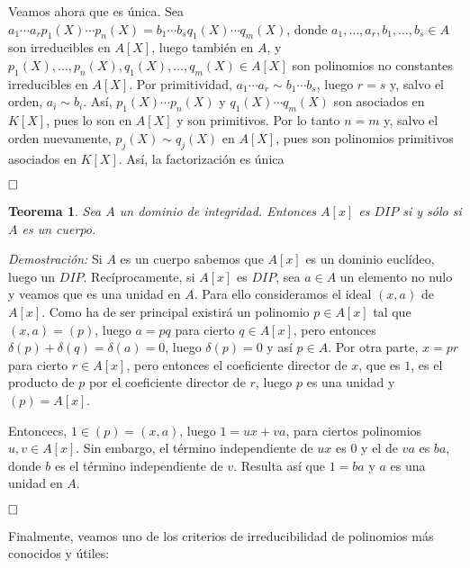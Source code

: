 \documentclass[12pt]{article}
\newtheorem{theorem}{Teorema}[section]
\begin{document}
Veamos ahora que es única. Sea $a_1\cdots a_rp_1(X) \cdots p_n(X)= b_1\cdots b_sq_1(X) \cdots q_m(X)$, donde $a_1, \ldots, a_r, b_1, \ldots, b_s \in A$ son irreducibles en $A[X]$, luego también en $A$, y $p_1(X), \ldots, p_n(X), q_1(X), \ldots, q_m(X) \in A[X]$ son polinomios no constantes irreducibles en $A[X]$. Por primitividad, $a_1 \cdots a_r \sim b_1 \cdots b_s$, luego $r=s$ y, salvo el orden, $a_i \sim b_i$. Así, $p_1(X) \cdots p_n(X)$ y $q_1(X) \cdots q_m(X)$ son asociados en $K[X]$, pues lo son en $A[X]$ y son primitivos. Por lo tanto $n=m$ y, salvo el orden nuevamente, $p_j(X) \sim q_j(X)$ en $A[X]$, pues son polinomios primitivos asociados en $K[X]$. Así, la factorización es única

$\hfill \square$

\begin{theorem}
Sea $A$ un dominio de integridad. Entonces $A[x]$ es $DIP$ si y sólo si $A$ es un cuerpo.
\end{theorem}
\emph{Demostración: }Si $A$ es un cuerpo sabemos que $A[x]$ es un dominio euclídeo, luego un $DIP$. Recíprocamente, si $A[x]$ es $DIP$, sea $a \in A$ un elemento no nulo y veamos que es una unidad en $A$. Para ello consideramos el ideal $(x,a)$ de $A[x]$. Como ha de ser principal existirá un polinomio $p \in A[x]$ tal que $(x,a)=(p)$, luego $a=pq$ para cierto $q \in A[x]$, pero entonces $\delta (p) + \delta (q)= \delta(a)=0$, luego $\delta(p)=0$ y así $p \in A$. Por otra parte, $x =pr$ para cierto $r \in A[x]$, pero entonces el coeficiente director de $x$, que es $1$, es el producto de $p$ por el coeficiente director de $r$, luego $p$ es una unidad y $(p) = A[x]$.

Entoncecs, $1 \in (p) = (x,a)$, luego $1 = ux+va$, para ciertos polinomios $u,v \in A[x]$. Sin embargo, el término independiente de $ux$ es $0$ y el de $va$ es $ba$, donde $b$ es el término independiente de $v$. Resulta así que $1 = ba$ y $a$ es una unidad en $A$.

$\hfill \square$

Finalmente, veamos uno de los criterios de irreducibilidad de polinomios más conocidos y útiles: 
\end{document}

